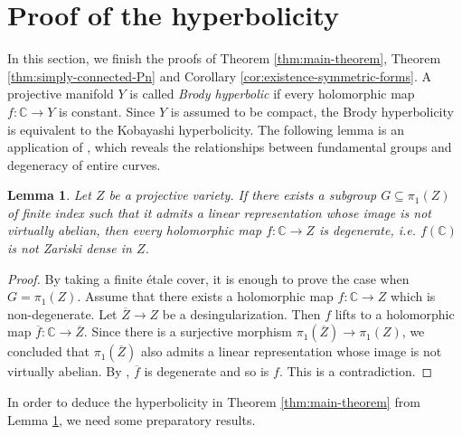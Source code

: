 \documentclass[english,reqno]{amsart}
\newcommand\bbC{{\mathbb C}}
\theoremstyle{plain}
\newtheorem{lemma}[thm]{Lemma}
\theoremstyle{definition}
\numberwithin{equation}{section} %
\begin{document}
\baselineskip







\section{Proof of the hyperbolicity}
\label{section:hyperbolicity}
In this section, we  finish the proofs of Theorem \ref{thm:main-theorem}, Theorem  \ref{thm:simply-connected-Pn} and Corollary \ref{cor:existence-symmetric-forms}.
A projective manifold $Y$ is called \emph{Brody hyperbolic}  if every  holomorphic map  $f\colon \bbC\rightarrow Y$ is constant. Since $Y$ is assumed to be compact, the Brody hyperbolicity is equivalent to the Kobayashi hyperbolicity.  
The following lemma is an application of \cite[Theorem 1.1]{Yamanoi2010}, which reveals  the relationships between fundamental groups  and   degeneracy of entire curves.

\begin{lemma}
	\label{lemma:representation-degenerate-entire-curve}
	Let $Z$ be a projective variety. If there exists   a  subgroup  $G\subseteq \pi_1(Z)$ of finite index such that it  admits a linear representation whose image is not virtually abelian, then every holomorphic map $f\colon \bbC \to Z$ is degenerate, i.e. $f(\bbC)$ is not Zariski dense in $Z$.
\end{lemma}

\begin{proof}
	By taking a finite \'etale cover, it is enough to prove the case when $G=\pi_1(Z)$.
	Assume that there exists a holomorphic map $f\colon \bbC \to Z$ which is non-degenerate. Let $\overline{Z} \to Z$ be a desingularization.
	Then $f$ lifts to a holomorphic map $\overline{f}\colon \bbC \to \overline{Z}$. Since there is a surjective morphism $\pi_1(\overline{Z}) \to \pi_1(Z)$, we concluded that $\pi_1(\overline{Z})$ also admits a linear representation whose image is not virtually abelian. By \cite[Theorem 1.1]{Yamanoi2010}, $\overline{f}$ is degenerate and so is $f$. This is a contradiction.
\end{proof}




In order to deduce the hyperbolicity in Theorem \ref{thm:main-theorem} from Lemma \ref{lemma:representation-degenerate-entire-curve}, we need some preparatory results.
\end{document}
